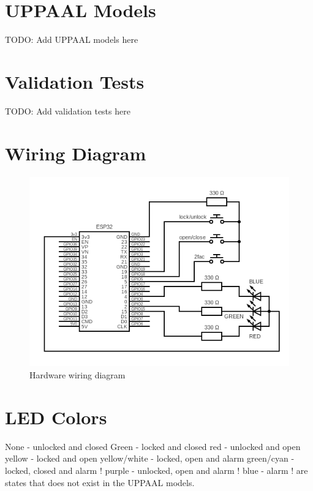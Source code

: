 \section{UPPAAL Models}
\label{app:UPPAALModels}

TODO: Add UPPAAL models here

\section{Validation Tests}
\label{app:ValidationTests}

TODO: Add validation tests here

\section{Wiring Diagram}
\label{app:WiringDiagram}

\begin{figure}[tbh]
\includegraphics[width=.95\textwidth]{./../circuit/circuit.png}
\caption{Hardware wiring diagram}
\label{app:fig:WiringDiagram}
\end{figure}

\section{LED Colors}
\label{app:LEDColors}
None - unlocked and closed
\newline
Green - locked and closed
\newline
red - unlocked and open
\newline
yellow - locked and open
\newline
yellow/white - locked, open and alarm
\newline
green/cyan - locked, closed and alarm
\newline
! purple - unlocked, open and alarm
\newline
! blue - alarm
\newline
! are states that does not exist in the UPPAAL models.